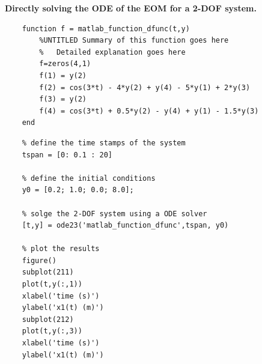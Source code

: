 \documentclass[12pt,letter]{article}
\begin{document}
	
	\begin{example}
	\textbf{Directly solving the ODE of the EOM for a 2-DOF system.} \\
	
	
		\lstset{linewidth=5.8in}
		\begin{minipage}{1\textwidth}
			\begin{center}
				\begin{lstlisting}
	function f = matlab_function_dfunc(t,y)
		%UNTITLED Summary of this function goes here
		%   Detailed explanation goes here
		f=zeros(4,1)
		f(1) = y(2)
		f(2) = cos(3*t) - 4*y(2) + y(4) - 5*y(1) + 2*y(3)
		f(3) = y(2)
		f(4) = cos(3*t) + 0.5*y(2) - y(4) + y(1) - 1.5*y(3)
	end 
				\end{lstlisting}
			\end{center}
		\end{minipage}
	
	
	
	
	
		\lstset{linewidth=5.8in}
		\begin{minipage}{1\textwidth}
			\begin{center}
				\begin{lstlisting}
	% define the time stamps of the system
	tspan = [0: 0.1 : 20]
	
	% define the initial conditions
	y0 = [0.2; 1.0; 0.0; 8.0];
	
	% solge the 2-DOF system using a ODE solver
	[t,y] = ode23('matlab_function_dfunc',tspan, y0)
	
	% plot the results
	figure()
	subplot(211)
	plot(t,y(:,1))
	xlabel('time (s)')
	ylabel('x1(t) (m)')
	subplot(212)
	plot(t,y(:,3))
	xlabel('time (s)')
	ylabel('x1(t) (m)')
				\end{lstlisting}
			\end{center}
		\end{minipage}
	
	\end{example}
	
	
	
	
\end{document}
